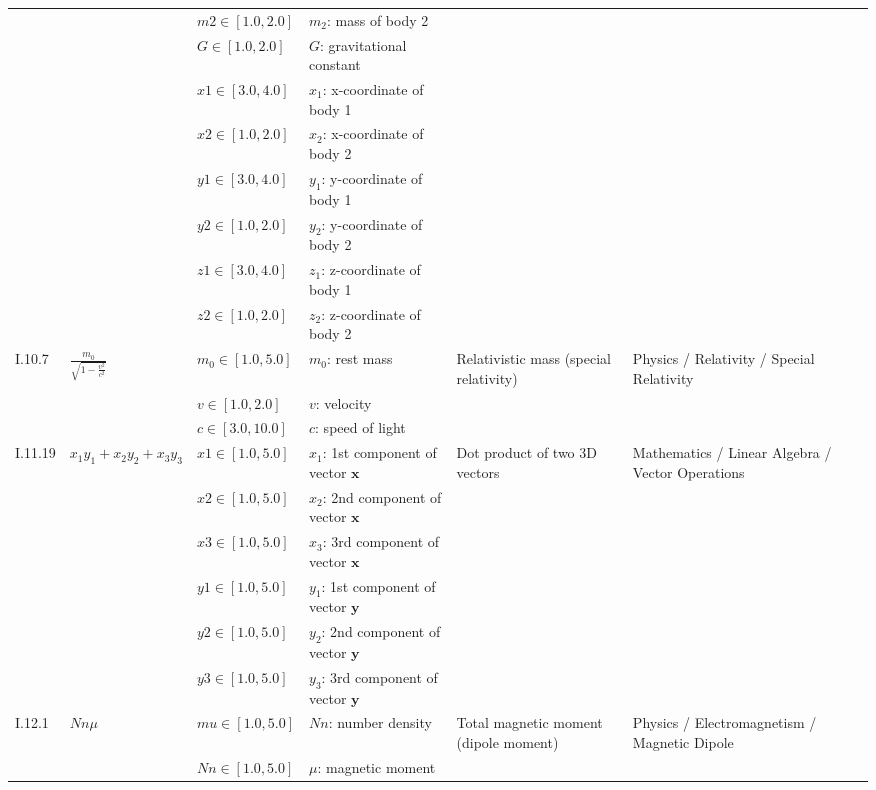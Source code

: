 \begin{longtable}{llllp{4cm}p{4cm}p{4cm}}
 &  & $\mathit{m2} \in [1.0,2.0]$ & $m_2$: mass of body 2 &  &  & \\
 &  & $\mathit{G} \in [1.0,2.0]$ & $G$: gravitational constant &  &  & \\
 &  & $\mathit{x1} \in [3.0,4.0]$ & $x_1$: x-coordinate of body 1 &  &  & \\
 &  & $\mathit{x2} \in [1.0,2.0]$ & $x_2$: x-coordinate of body 2 &  &  & \\
 &  & $\mathit{y1} \in [3.0,4.0]$ & $y_1$: y-coordinate of body 1 &  &  & \\
 &  & $\mathit{y2} \in [1.0,2.0]$ & $y_2$: y-coordinate of body 2 &  &  & \\
 &  & $\mathit{z1} \in [3.0,4.0]$ & $z_1$: z-coordinate of body 1 &  &  & \\
 &  & $\mathit{z2} \in [1.0,2.0]$ & $z_2$: z-coordinate of body 2 &  &  & \\
\hline
I.10.7 & $\frac{m_{0}}{\sqrt{1 - \frac{v^{2}}{c^{2}}}}$ & $\mathit{m_0} \in [1.0,5.0]$ & $m_0$: rest mass & Relativistic mass (special relativity) & Physics / Relativity / Special Relativity & \\
 &  & $\mathit{v} \in [1.0,2.0]$ & $v$: velocity &  &  & \\
 &  & $\mathit{c} \in [3.0,10.0]$ & $c$: speed of light &  &  & \\
\hline
I.11.19 & $x_{1} y_{1} + x_{2} y_{2} + x_{3} y_{3}$ & $\mathit{x1} \in [1.0,5.0]$ & $x_1$: 1st component of vector $\mathbf{x}$ & Dot product of two 3D vectors & Mathematics / Linear Algebra / Vector Operations & \\
 &  & $\mathit{x2} \in [1.0,5.0]$ & $x_2$: 2nd component of vector $\mathbf{x}$ &  &  & \\
 &  & $\mathit{x3} \in [1.0,5.0]$ & $x_3$: 3rd component of vector $\mathbf{x}$ &  &  & \\
 &  & $\mathit{y1} \in [1.0,5.0]$ & $y_1$: 1st component of vector $\mathbf{y}$ &  &  & \\
 &  & $\mathit{y2} \in [1.0,5.0]$ & $y_2$: 2nd component of vector $\mathbf{y}$ &  &  & \\
 &  & $\mathit{y3} \in [1.0,5.0]$ & $y_3$: 3rd component of vector $\mathbf{y}$ &  &  & \\
\hline
I.12.1 & $Nn \mu$ & $\mathit{mu} \in [1.0,5.0]$ & $Nn$: number density & Total magnetic moment (dipole moment) & Physics / Electromagnetism / Magnetic Dipole & \\
 &  & $\mathit{Nn} \in [1.0,5.0]$ & $\mu$: magnetic moment &  &  & \\

\end{longtable}
